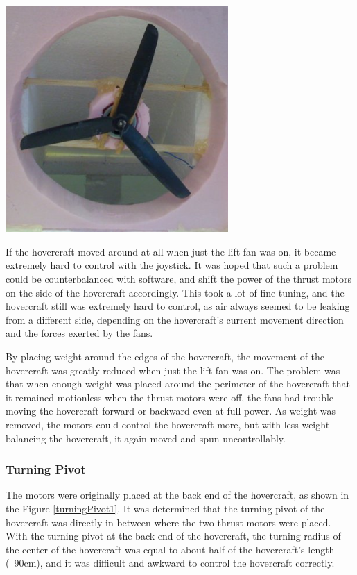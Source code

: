\begin{minipage}{6.5in}
\centering
  \includegraphics[width=85mm]{imageSources/weightDistro2.png}

\label{weightDistro2}
\end{minipage}

If the hovercraft moved around at all when just the lift fan was on, it became extremely hard to control with the joystick. It was hoped that such a problem could be counterbalanced with software, and shift the power of the thrust motors on the side of the hovercraft accordingly. This took a lot of fine-tuning, and the hovercraft still was extremely hard to control, as air always seemed to be leaking from a different side, depending on the hovercraft's current movement direction and the forces exerted by the fans.

By placing weight around the edges of the hovercraft, the movement of the hovercraft was greatly reduced when just the lift fan was on. The problem was that when enough weight was placed around the perimeter of the hovercraft that it remained motionless when the thrust motors were off, the fans had trouble moving the hovercraft forward or backward even at full power. As weight was removed, the motors could control the hovercraft more, but with less weight balancing the hovercraft, it again moved and spun uncontrollably.

\subsubsection{Turning Pivot}
The motors were originally placed at the back end of the hovercraft, as shown in the Figure \ref{turningPivot1}.  It was determined that the turning pivot of the hovercraft was directly in-between where the two thrust motors were placed. With the turning pivot at the back end of the hovercraft, the turning radius of the center of the hovercraft was equal to about half of the hovercraft's length (~90cm), and it was difficult and awkward to control the hovercraft correctly. 

